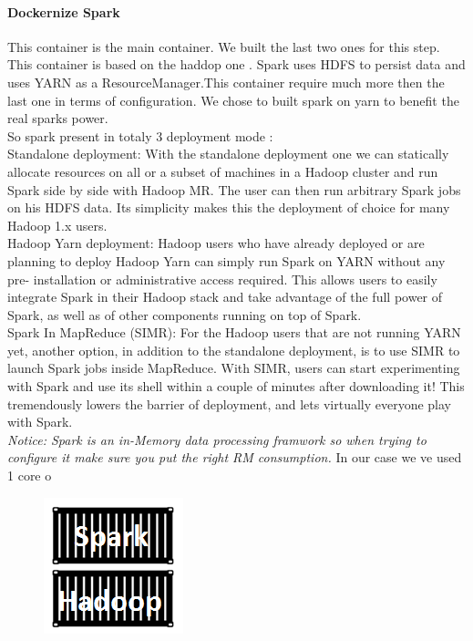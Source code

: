 \paragraph{Dockernize Spark}
\label{sec:sec01}
This container is the main container. We built the last two ones for this step. This container is based on the haddop one . Spark uses HDFS to persist data
and uses YARN as a ResourceManager.This container require much more then the last one in terms of configuration. We chose to built spark on yarn to benefit the real sparks power. \\
So spark present in totaly 3 deployment mode :\\
Standalone deployment: With the standalone deployment one we can statically
allocate resources on all or a subset of machines in a Hadoop cluster and run
Spark side by side with Hadoop MR. The user can then run arbitrary Spark jobs
on his HDFS data. Its simplicity makes this the deployment of choice for many
Hadoop 1.x users.\\
Hadoop Yarn deployment: Hadoop users who have already deployed or are
planning to deploy Hadoop Yarn can simply run Spark on YARN without any pre-
installation or administrative access required. This allows users to easily
integrate Spark in their Hadoop stack and take advantage of the full power of
Spark, as well as of other components running on top of Spark.\\
Spark In MapReduce (SIMR): For the Hadoop users that are not running YARN
yet, another option, in addition to the standalone deployment, is to use SIMR to
launch Spark jobs inside MapReduce. With SIMR, users can start experimenting
with Spark and use its shell within a couple of minutes after downloading it! This
tremendously lowers the barrier of deployment, and lets virtually everyone play
with Spark.\\
\textit{
Notice:
 Spark is an in-Memory data processing framwork so when trying to configure it make sure you put the right RM consumption.
}
In our case we ve used 1 core o
\begin{figure}[h!]
	\centering
	\includegraphics[height=0.2\textheight]{fig01/SparkContainer}
	\label{fig:FilialesEtClients}
\end{figure}

